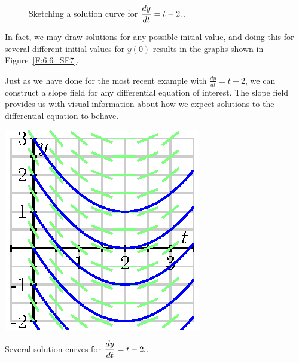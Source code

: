 \begin{figure}
\begin{flushright}
\hspace{.25cm}
\end{flushright}
\caption{Sketching a solution curve for $\displaystyle \frac{dy}{dt} = t-2.$.}
\label{F:6.6_SF6}
\end{figure}

In fact, we may draw solutions for any possible initial value, and doing this for several different initial values for $y(0)$ results in the graphs shown in Figure~\ref{F:6.6_SF7}.
 
Just as we have done for the most recent example with $\frac{dy}{dt} = t-2$, we can construct a slope field for any differential equation of interest.  The slope field provides us with visual information about how we expect solutions to the differential equation to behave.

\begin{marginfigure} %
\begin{center}
\includegraphics{figures/7_2_field_4.eps}
\end{center}
\caption{Several solution curves for $\displaystyle \frac{dy}{dt} = t-2.$. }
\label{F:6.6_SF7}
\end{marginfigure}

